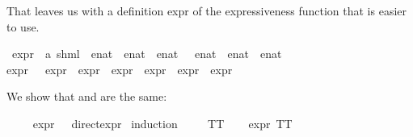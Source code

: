 \begin{isabellebody}
\begin{isamarkuptext}%
That leaves us with a definition \textsf{expr} of the expressiveness function that is easier to use.%
\end{isamarkuptext}\isamarkuptrue%
\isamarkupfalse%
\ expr\ {\isacharcolon}{\kern0pt}{\isacharcolon}{\kern0pt}\ {\isachardoublequoteopen}{\isacharparenleft}{\kern0pt}{\isacharprime}{\kern0pt}a{\isacharcomma}{\kern0pt}\ {\isacharprime}{\kern0pt}s{\isacharparenright}{\kern0pt}hml\ {\isasymRightarrow}\ enat\ {\isasymtimes}\ enat\ {\isasymtimes}\ enat\ {\isasymtimes}\ \ enat\ {\isasymtimes}\ enat\ {\isasymtimes}\ enat{\isachardoublequoteclose}\ \isanewline
\ \ \isanewline
{\isacartoucheopen}expr\ {\isasymphi}\ {\isacharequal}{\kern0pt}\ {\isacharparenleft}{\kern0pt}expr{\isacharunderscore}{\kern0pt}{}\ {\isasymphi}{\isacharcomma}{\kern0pt}\ expr{\isacharunderscore}{\kern0pt}{}\ {\isasymphi}{\isacharcomma}{\kern0pt}\ expr{\isacharunderscore}{\kern0pt}{}\ {\isasymphi}{\isacharcomma}{\kern0pt}\ expr{\isacharunderscore}{\kern0pt}{}\ {\isasymphi}{\isacharcomma}{\kern0pt}\ expr{\isacharunderscore}{\kern0pt}{}\ {\isasymphi}{\isacharcomma}{\kern0pt}\ expr{\isacharunderscore}{\kern0pt}{}\ {\isasymphi}{\isacharparenright}{\kern0pt}{\isacartoucheclose}%
\begin{isamarkuptext}%
We show that  and  are the same:%
\end{isamarkuptext}\isamarkuptrue%
%
\isadelimproof
%
\endisadelimproof
%
\isatagproof
%
\endisatagproof
{\isafoldproof}%
%
\isadelimproof
%
\endisadelimproof
%
\isadelimproof
%
\endisadelimproof
%
\isatagproof
%
\endisatagproof
{\isafoldproof}%
%
\isadelimproof
%
\endisadelimproof
%
\isadelimproof
%
\endisadelimproof
%
\isatagproof
%
\endisatagproof
{\isafoldproof}%
%
\isadelimproof
\isanewline
%
\endisadelimproof
{}\isamarkupfalse%
\ \isanewline
\ \ \ {\isachardoublequoteopen}expr\ {\isasymphi}\ {\isacharequal}{\kern0pt}\ direct{\isacharunderscore}{\kern0pt}expr\ {\isasymphi}{\isachardoublequoteclose}\isanewline
%
\isadelimproof
%
\endisadelimproof
%
\isatagproof
{}\isamarkupfalse%
{\isacharparenleft}{\kern0pt}induction\ {\isasymphi}{\isacharparenright}{\kern0pt}\isanewline
\ \ \isamarkupfalse%
\ TT\isanewline
\ \ \isamarkupfalse%
\ {\isachardoublequoteopen}expr\ TT\ {\isacharequal}{\kern0pt}\ {\isacharparenleft}{\kern0pt}{}{\isacharcomma}{\kern0pt}\ {}{\isacharcomma}{\kern0pt}\ {}{\isacharcomma}{\kern0pt}\ {}{\isacharcomma}{\kern0pt}\ {}{\isacharcomma}{\kern0pt}\ {}{\isacharparenright}{\kern0pt}{\isachardoublequoteclose}\ \isamarkupfalse%

\end{isabellebody}
